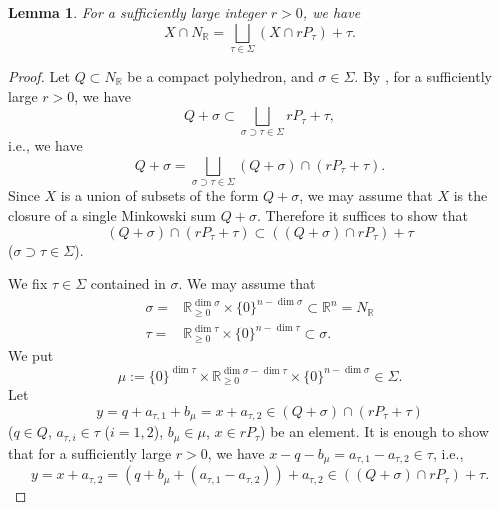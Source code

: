 \documentclass[12pt,a4]{amsart}
\newtheorem{lem}[thm]{Lemma}
\def\R{\mathbb{R}}
\numberwithin{equation}{section}
\numberwithin{figure}{section}
\begin{document}
    
  \begin{lem}\label{existence of nice dual polytope}
   For a sufficiently large integer $r>0$, 
   we have 
      $$ X \cap N_\R = \bigsqcup_{
         \tau \in \Sigma   } 
      ( X \cap r P_{\tau })  + \tau. $$
    \end{lem}  
   \begin{proof}
     Let $Q \subset N_\R$ be a 
     compact polyhedron, 
        and  $\sigma \in \Sigma$.
    By , 
    for a sufficiently large $r >0$, 
     we have  
     $$ Q + \sigma \subset 
      \bigsqcup_{\sigma \supset \tau \in \Sigma }  rP_{\tau} + \tau, $$
    i.e., we have 
     $$ Q + \sigma = 
      \bigsqcup_{\sigma \supset \tau \in \Sigma } 
      (Q + \sigma) \cap ( rP_{\tau} + \tau). $$
      Since $X$ is a union of subsets of the form $Q + \sigma$, 
    we may assume that 
     $X$ is the closure of 
     a single Minkowski sum $ Q + \sigma $.
     Therefore 
    it suffices to show that 
      $$(Q + \sigma) \cap ( rP_{\tau} + \tau) \subset  
      ( (Q + \sigma) \cap  rP_{\tau} ) + \tau $$
    ($ \sigma \supset \tau \in \Sigma$).

     We fix $ \tau \in \Sigma$ contained in $\sigma$.
     We may assume that 
     \begin{align*}
     \sigma = &  \R_{\geq 0}^{\dim \sigma} \times \{ 0 \}^{n-\dim \sigma}  \subset \R^n = N_\R  \\
     \tau = & \R_{\geq 0}^{\dim \tau} \times \{  0\}^{n-\dim \tau} \subset \sigma .
     \end{align*}
    We put 
    $$\mu := \{ 0 \}^{\dim \tau } \times \R_{\geq 0}^{\dim \sigma - \dim \tau } \times \{ 0 \}^{n-\dim \sigma} \in \Sigma.$$
     Let 
     $$y =q+a_{\tau,1} + b_\mu
         = x + a_{\tau,2} \in (Q + \sigma) \cap ( rP_{\tau} + \tau) $$
     ($q \in Q$, $a_{\tau,i} \in \tau$ ($i =1,2$), $b_\mu \in \mu$, $x \in rP_\tau$) be an element. 
     It is enough to show 
      that for a sufficiently large $r >0$, 
      we have  $x-q-b_\mu = a_{\tau,1}-a_{\tau,2} \in \tau$, i.e., 
      $$y= x +a_{\tau,2} = 
      (q+b_{\mu}+ (a_{\tau,1}-a_{\tau,2}) )+a_{\tau,2} \in ( (Q + \sigma) \cap  rP_{\tau} ) + \tau 
      .$$
      


\end{proof}
\end{document}
